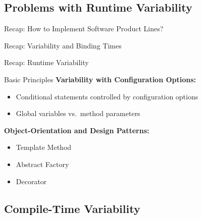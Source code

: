 \subsection{Problems with Runtime Variability}

\begin{frame}{Recap: How to Implement Software Product Lines?}
	\frameImplementSPLs
\end{frame}

\begin{frame}{Recap: Variability and Binding Times}
	\frameVariabilityAndBindingTimes
\end{frame}

\begin{frame}{Recap: Runtime Variability}
	\begin{mycolumns}[t]
		\begin{note}{Basic Principles}
			{\bf Variability with Configuration Options:}
			\begin{itemize}
				\item Conditional statements controlled by configuration options
				\item Global variables vs.\ method parameters
			\end{itemize}
			{\bf Object-Orientation and Design Patterns:}
			\begin{itemize}
				\item Template Method
				\item Abstract Factory
				\item Decorator
			\end{itemize}	
		\end{note}
	\mynextcolumn
		\frameRuntimeVariabilityProblems
	\end{mycolumns}	
\end{frame}

\subsection{Compile-Time Variability}

